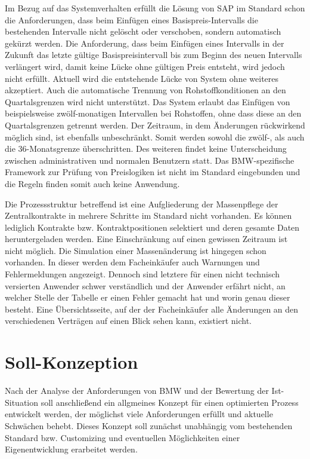 Im Bezug auf das Systemverhalten erfüllt die Lösung von SAP im Standard schon die Anforderungen, dass beim Einfügen eines Basispreis-Intervalls die bestehenden Intervalle nicht gelöscht oder verschoben, sondern automatisch gekürzt werden. Die Anforderung, dass beim Einfügen eines Intervalls in der Zukunft das letzte gültige Basispreisintervall bis zum Beginn des neuen Intervalls verlängert wird, damit keine Lücke ohne gültigen Preis entsteht, wird jedoch nicht erfüllt. Aktuell wird die entstehende Lücke von System ohne weiteres akzeptiert. Auch die automatische Trennung von Rohstoffkonditionen an den Quartalsgrenzen wird nicht unterstützt. Das System erlaubt das Einfügen von beispielsweise zwölf-monatigen Intervallen bei Rohstoffen, ohne dass diese an den Quartalsgrenzen getrennt werden. Der Zeitraum, in dem Änderungen rückwirkend möglich sind, ist ebenfalls unbeschränkt. Somit werden sowohl die zwölf-, als auch die 36-Monatsgrenze überschritten. Des weiteren findet keine Unterscheidung zwischen administrativen und normalen Benutzern statt. Das BMW-spezifische Framework zur Prüfung von Preislogiken ist nicht im Standard eingebunden und die Regeln finden somit auch keine Anwendung.

Die Prozessstruktur betreffend ist eine Aufgliederung der Massenpflege der Zentralkontrakte in mehrere Schritte im Standard nicht vorhanden. Es können lediglich Kontrakte bzw. Kontraktpositionen selektiert und deren gesamte Daten heruntergeladen werden. Eine Einschränkung auf \zB einen gewissen Zeitraum ist nicht möglich. Die Simulation einer Massenänderung ist hingegen schon vorhanden. In dieser werden dem Facheinkäufer auch Warnungen und Fehlermeldungen angezeigt. Dennoch sind letztere für einen nicht technisch versierten Anwender schwer verständlich und der Anwender erfährt nicht, an welcher Stelle der Tabelle er einen Fehler gemacht hat und worin genau dieser besteht.  Eine Übersichtsseite, auf der der Facheinkäufer alle Änderungen an den verschiedenen Verträgen auf einen Blick sehen kann, existiert nicht.

\section{Soll-Konzeption}

Nach der Analyse der Anforderungen von BMW und der Bewertung der Ist-Situation soll anschlie\ss end ein allgmeines Konzept für einen optimierten Prozess entwickelt werden, der möglichst viele Anforderungen erfüllt und aktuelle Schwächen behebt. Dieses Konzept soll zunächst unabhängig vom bestehenden Standard bzw. Customizing und eventuellen Möglichkeiten einer Eigenentwicklung erarbeitet werden.

